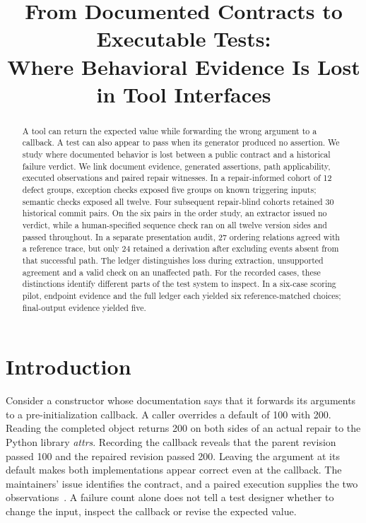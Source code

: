 \documentclass[conference]{IEEEtran}
\title{From Documented Contracts to Executable Tests:\\Where Behavioral Evidence Is Lost in Tool Interfaces}
\author{}
\begin{document}
\maketitle

\begin{abstract}
A tool can return the expected value while forwarding the wrong argument to a callback. A test can also appear to pass when its generator produced no assertion. We study where documented behavior is lost between a public contract and a historical failure verdict. We link document evidence, generated assertions, path applicability, executed observations and paired repair witnesses. In a repair-informed cohort of 12 defect groups, exception checks exposed five groups on known triggering inputs; semantic checks exposed all twelve. Four subsequent repair-blind cohorts retained 30 historical commit pairs. On the six pairs in the order study, an extractor issued no verdict, while a human-specified sequence check ran on all twelve version sides and passed throughout. In a separate presentation audit, 27 ordering relations agreed with a reference trace, but only 24 retained a derivation after excluding events absent from that successful path. The ledger distinguishes loss during extraction, unsupported agreement and a valid check on an unaffected path. For the recorded cases, these distinctions identify different parts of the test system to inspect. In a six-case scoring pilot, endpoint evidence and the full ledger each yielded six reference-matched choices; final-output evidence yielded five.
\end{abstract}

\section{Introduction}
Consider a constructor whose documentation says that it forwards its arguments to a pre-initialization callback. A caller overrides a default of 100 with 200. Reading the completed object returns 200 on both sides of an actual repair to the Python library \emph{attrs}. Recording the callback reveals that the parent revision passed 100 and the repaired revision passed 200. Leaving the argument at its default makes both implementations appear correct even at the callback. The maintainers' issue identifies the contract, and a paired execution supplies the two observations~\cite{attrsissue}. A failure count alone does not tell a test designer whether to change the input, inspect the callback or revise the expected value.
\end{document}
